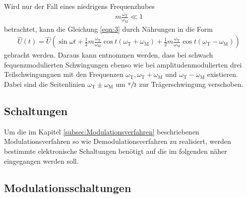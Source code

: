 
Wird nur der Fall eines
niedrigens Frequenzhubes
\begin{align*}
  m\frac{\omega_{\text{T}}}{\omega_{\text{M}}} \ll 1
\end{align*}
betrachtet, kann die Gleichung
\eqref{eqn:3} durch Nährungen
in die Form
\begin{align}
\hat{U}(t)=\hat{U}\left(\sin \omega t + \frac12 m\frac{\omega_{\text{T}}}{\omega_{\text{M}}}\cos t(\omega_{\text{T}}+\omega_{\text{M}})
+ \frac12 m\frac{\omega_{\text{T}}}{\omega_{\text{M}}}\cos t(\omega_{\text{T}}-\omega_{\text{M}}) \right)
\end{align}
gebracht werden.
Daraus kann entnommen werden, dass
bei schwach fequenzmodulierten Schwingungen
ebenso wie bei amplitudenmodulierten
drei Teilschwingungnen mit den Frequenzen $\omega_{\text{T}},\omega_{\text{T}}+\omega_{\text{M}}$
und $\omega_{\text{T}}-\omega_{\text{M}}$ existieren.
Dabei sind die Seitenlinien $\omega_{\text{T}}\pm\omega_{\text{M}}$
um $\sfrac{\pi}{2}$ zur Trägerschwingung verschoben.


\subsection{Schaltungen}
\label{subsec:Schaltungen}
Um die im Kapitel \ref{subsec:Modulationsverfahren}
beschriebenen Modulationsverfahren so wie Demodulationsverfahren zu realisiert, werden
bestimmte elektronische Schaltungen
benötigt auf die im folgenden näher eingegangen werden soll.

\subsection{Modulationsschaltungen}
\label{subsubsec:Modulationsschaltungen}
